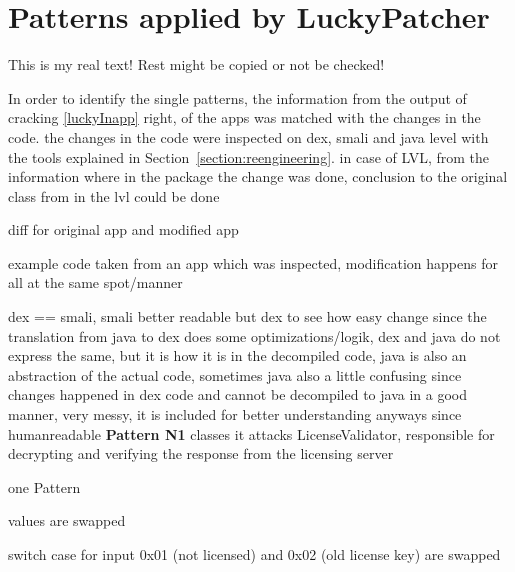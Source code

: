 \section{Patterns applied by LuckyPatcher} \label{section:luckypatcher-patterns}
This is my real text! Rest might be copied or not be checked!

In order to identify the single patterns, the information from the output of cracking \ref{luckyInapp} right, of the apps was matched with the changes in the code. the changes in the code were inspected on dex, smali and java level with the tools explained in Section~\ref{section:reengineering}. in case of LVL, from the information where in the package the change was done, conclusion to the original class from in the lvl could be done

diff for original app and modified app

example code taken from an app which was inspected, modification happens for all at the same spot/manner

dex == smali, smali better readable but dex to see how easy change
since the translation from java to dex does some optimizations/logik, dex and java do not express the same, but it is how it is in the decompiled code, java is also an abstraction of the actual code, sometimes java also a little confusing since changes happened in dex code and cannot be decompiled to java in a good manner, very messy, it is included for better understanding anyways since humanreadable
\newline
\newline
\textbf{Pattern N1} \newline
classes it attacks
LicenseValidator, responsible for decrypting and verifying the response from the licensing server

one Pattern



values are swapped



switch case for input 0x01 (not licensed) and 0x02 (old license key) are swapped

